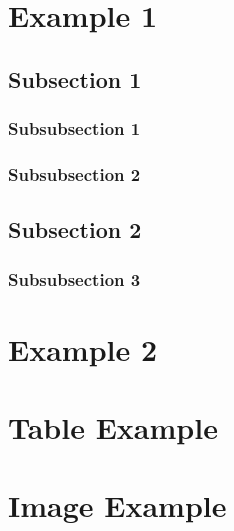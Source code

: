 \section{Example 1}
\lipsum[1]
\subsection{Subsection 1}
\lipsum[2-3]
\subsubsection{Subsubsection 1}
\lipsum[4-5]
\subsubsection{Subsubsection 2}
\lipsum[6]
\subsection{Subsection 2}
\lipsum[7]
\subsubsection{Subsubsection 3}
\lipsum[8-9]

\section{Example 2}
\lipsum[10-11]

\section{Table Example}
\section{Image Example}
